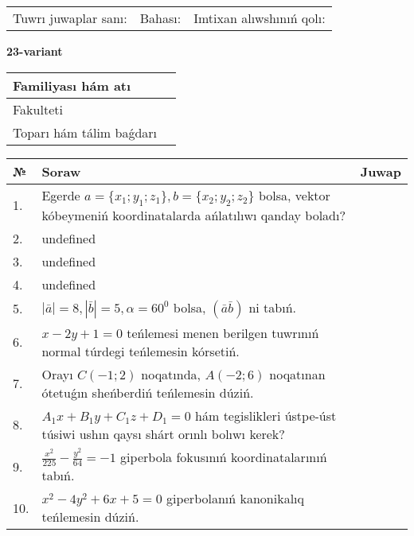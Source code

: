 \documentclass{article}
\begin{document}
\vspace{0.7cm}

\begin{tabular}{lll}
Tuwrı juwaplar sanı: \underline{\hspace{1cm}} & 
Bahası: \underline{\hspace{1cm}} & 
Imtixan alıwshınıń qolı: \underline{\hspace{2cm}} \\
\end{tabular}

\egroup

\newpage


\textbf{23-variant}\\

\bgroup
\def\arraystretch{1.6} %

\begin{tabular}{|m{5.7cm}|m{9.5cm}|}
\hline
Familiyası hám atı & \\
\hline
Fakulteti  & \\
\hline
Toparı hám tálim baǵdarı  & \\
\hline
\end{tabular}

\vspace{0.7cm}

\begin{tabular}{|m{0.7cm}|m{10cm}|m{4cm}|}
\hline
№ & Soraw & Juwap \\
\hline
1. & Egerde \(a = \{ x_{1}; y_{1}; z_{1}\}, b = \{ x_{2}; y_{2}; z_{2}\}\) bolsa, vektor kóbeymeniń koordinatalarda ańlatılıwı qanday boladı? &  \\
\hline
2. & undefined &  \\
\hline
3. & undefined &  \\
\hline
4. & undefined &  \\
\hline
5. & \(\left| \bar{a} \right| = 8, \left| \bar{b} \right| = 5, \alpha = 60^{0}\) bolsa, \(( \bar{a}\bar{b} )\) ni tabıń. &  \\
\hline
6. & \(x - 2 y + 1 = 0\) teńlemesi menen berilgen tuwrınıń normal túrdegi teńlemesin kórsetiń. &  \\
\hline
7. & Orayı \(C (- 1;2)\) noqatında, \(A (- 2;6 )\) noqatınan ótetuǵın sheńberdiń teńlemesin dúziń. &  \\
\hline
8. & \(A_{1}x + B_{1}y + C_{1}z + D_{1} = 0\) hám tegislikleri ústpe-úst túsiwi ushın qaysı shárt orınlı bolıwı kerek? &  \\
\hline
9. & \(\frac{x^{2}}{225} - \frac{y^{2}}{64} = - 1\) giperbola fokusınıń koordinatalarınıń tabıń. &  \\
\hline
10. & \(x^{2} - 4 y^{2} + 6 x + 5 = 0\) giperbolanıń kanonikalıq teńlemesin dúziń. & \\
\hline
\end{tabular}
\end{document}
